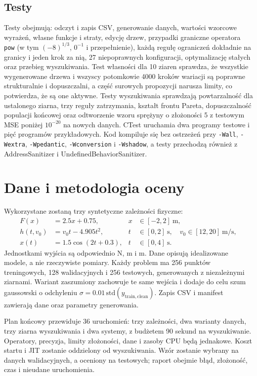 \documentclass[11pt,a4paper]{article}
\begin{document}
\subsection{Testy}
Testy obejmują: odczyt i zapis CSV, generowanie danych, wartości wzorcowe
wyrażeń, własne funkcje i straty, edycję drzew, przypadki graniczne
operatora \texttt{pow} (w tym $(-8)^{1/3}$, $0^{-1}$ i przepełnienie), każdą regułę
ograniczeń dokładnie na granicy i jeden krok za nią, 27 niepoprawnych
konfiguracji, optymalizację stałych oraz przebieg wyszukiwania. Test
własności dla 10 ziaren sprawdza, że wszystkie wygenerowane drzewa i wszyscy
potomkowie 4000 kroków wariacji są poprawne strukturalnie i dopuszczalni,
a część surowych propozycji narusza limity, co potwierdza, że są one aktywne.
Testy wyszukiwania sprawdzają powtarzalność dla ustalonego ziarna, trzy reguły
zatrzymania, kształt frontu Pareta, dopuszczalność populacji końcowej oraz
odtworzenie wzoru sprężyny o złożoności 5 z testowym MSE poniżej $10^{-20}$
na nowych danych. CTest uruchamia dwa programy testowe i pięć programów
przykładowych. Kod kompiluje się bez ostrzeżeń przy \texttt{-Wall},
\texttt{-Wextra}, \texttt{-Wpedantic}, \texttt{-Wconversion} i \texttt{-Wshadow},
a testy przechodzą również z AddressSanitizer i UndefinedBehaviorSanitizer.

\section{Dane i metodologia oceny}
Wykorzystane zostaną trzy syntetyczne zależności fizyczne:
\begin{align*}
 F(x) &= 2.5x + 0.75, & x &\in [-2,2]\ \mathrm{m},\\
 h(t,v_0) &= v_0t - 4.905t^2, & t &\in [0,2]\ \mathrm{s},\quad v_0\in[12,20]\ \mathrm{m/s},\\
 x(t) &= 1.5\cos(2t+0.3), & t &\in [0,4]\ \mathrm{s}.
\end{align*}
Jednostkami wyjścia są odpowiednio N, m i m. Dane opisują idealizowane modele,
a nie rzeczywiste pomiary. Każdy problem ma 256 punktów treningowych,
128 walidacyjnych i 256 testowych, generowanych z niezależnymi ziarnami.
Wariant zaszumiony zachowuje te same wejścia i dodaje do celu szum
gaussowski o odchyleniu $\sigma = 0.01\,\mathrm{std}(y_{\mathrm{train,clean}})$.
Zapis CSV i manifest zawierają dane oraz parametry generowania.

Plan końcowy przewiduje 36 uruchomień: trzy zależności, dwa warianty danych,
trzy ziarna wyszukiwania i dwa systemy, z budżetem 90 sekund na wyszukiwanie.
Operatory, precyzja, limity złożoności, dane i zasoby CPU będą jednakowe.
Koszt startu i JIT zostanie oddzielony od wyszukiwania. Wzór zostanie wybrany
na danych walidacyjnych, a oceniony na testowych; raport obejmie błąd,
złożoność, czas i nieudane uruchomienia.
\end{document}
